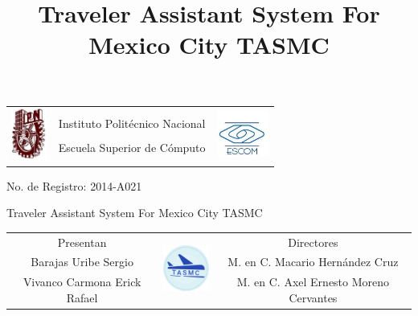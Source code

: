 \documentclass[12pt]{beamer}
\title[TASMC]{Traveler Assistant System For Mexico City TASMC}
\date{}
\begin{document}
\begin{frame}
	\begin{center}
	\begin{minipage}[t]{0.73\textwidth}	
		\begin{tabular}{ccc}
			\multirow{4}{*}{\includegraphics[height=1.7cm]{imagenes/ipn.jpg}} &
			&
     	 	\multirow{4}{*}{\includegraphics[height=1.5cm]{imagenes/escom.jpg}} \\
      		& Instituto Politécnico Nacional & \\
      		& Escuela Superior de Cómputo & \\
      		&&\\
		\end{tabular}
	\end{minipage}
	\end{center}
	
	\begin{center}
		\small No. de Registro: 2014-A021 \\
	\end{center}		
	
	\begin{center}
		\textcolor[RGB]{0,0,204}{\Large Traveler Assistant System For Mexico City TASMC}
	\end{center}		
		
	\begin{center}
	\begin{minipage}[t]{1\textwidth}	
		\begin{tabular}{ccc}
			Presentan & 
			\multirow{4}{*}{\includegraphics[height=1.7cm]{imagenes/logo.png}} & Directores \\
			\scriptsize Barajas Uribe Sergio & & \scriptsize  M. en C. Macario Hernández Cruz\\
			\scriptsize Vivanco Carmona Erick Rafael & & \scriptsize M. en C. Axel Ernesto Moreno Cervantes
		\end{tabular}
	\end{minipage}
	\end{center}
\end{frame}
\end{document}
